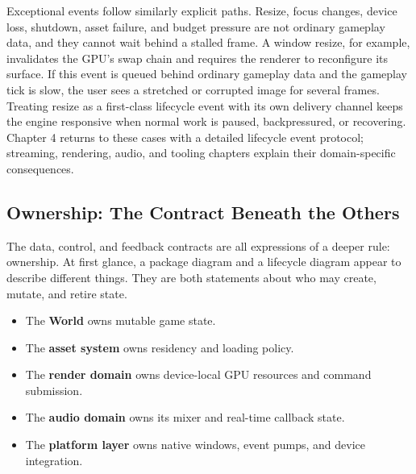 \documentclass[
  11pt,
  letterpaper,
  DIV=11,
  numbers=noendperiod,
  twoside,
  open=right]{scrreprt}
\providecommand{\tightlist}{%
  \setlength{\itemsep}{0pt}\setlength{\parskip}{0pt}}
\begin{document}
Exceptional events follow similarly explicit paths. Resize, focus
changes, device loss, shutdown, asset failure, and budget pressure are
not ordinary gameplay data, and they cannot wait behind a stalled frame.
A window resize, for example, invalidates the GPU's swap chain and
requires the renderer to reconfigure its surface. If this event is
queued behind ordinary gameplay data and the gameplay tick is slow, the
user sees a stretched or corrupted image for several frames. Treating
resize as a first-class lifecycle event with its own delivery channel
keeps the engine responsive when normal work is paused, backpressured,
or recovering. Chapter 4 returns to these cases with a detailed
lifecycle event protocol; streaming, rendering, audio, and tooling
chapters explain their domain-specific consequences.

\subsection{Ownership: The Contract Beneath the
Others}\label{ownership-the-contract-beneath-the-others}

The data, control, and feedback contracts are all expressions of a
deeper rule: ownership. At first glance, a package diagram and a
lifecycle diagram appear to describe different things. They are both
statements about who may create, mutate, and retire state.

\begin{itemize}
\tightlist
\item
  The \textbf{World} owns mutable game state.
\item
  The \textbf{asset system} owns residency and loading policy.
\item
  The \textbf{render domain} owns device-local GPU resources and command
  submission.
\item
  The \textbf{audio domain} owns its mixer and real-time callback state.
\item
  The \textbf{platform layer} owns native windows, event pumps, and
  device integration.
\end{itemize}
\end{document}
